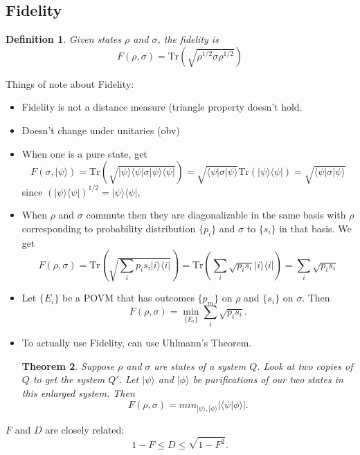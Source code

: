 \documentclass[12pt]{article}
\newtheorem{theorem}{Theorem}[section]
\newtheorem{define}[theorem]{Definition}
\begin{document}
\subsection{Fidelity}
\begin{define}
Given states $\rho$ and $\sigma$, the fidelity is
$$F(\rho,\sigma)=\text{Tr}(\sqrt{\rho^{1/2}\sigma\rho^{1/2}})$$
\end{define}
Things of note about Fidelity:
\begin{itemize}
\item Fidelity is not a distance measure (triangle property doesn't hold.
\item Doesn't change under unitaries (obv)
\item When one is a pure state, get 
$$ F(\sigma, |\psi\rangle)=\text{Tr}(\sqrt{|\psi\rangle\langle\psi|\sigma|\psi\rangle\langle\psi|})=\sqrt{\langle\psi|\sigma|\psi\rangle}\text{Tr}(|\psi\rangle\langle\psi|)=\sqrt{\langle\psi|\sigma|\psi\rangle}$$
since $(|\psi\rangle\langle\psi|)^{1/2}=|\psi\rangle\langle\psi|$, 
\item When $\rho$ and $\sigma$ commute then they are diagonalizable in the same basis with $\rho$ corresponding to probability 
distribution $\{p_i\}$ and $\sigma$ to $\{s_i\}$ in that basis. We get
$$F(\rho,\sigma)=\text{Tr}(\sqrt{\sum_ip_is_i|i\rangle\langle i|})=\text{Tr}(\sum_i\sqrt{p_is_i}|i\rangle\langle i|)=\sum_i\sqrt{p_is_i}$$
\item Let $\{E_i\}$ be a POVM that has outcomes $\{p_m\}$ on $\rho$ and $\{s_i\}$ on $\sigma$. Then
$$ F(\rho,\sigma)=\min_{\{E_i\}}\sum_i\sqrt{p_is_i}.$$
\item To actually use Fidelity, can use Uhlmann's Theorem.
\begin{theorem}
Suppose $\rho$ and $\sigma$ are states of a system $Q$. Look at two copies of $Q$ to get the system $Q'$. Let $|\psi\rangle$ and $|\phi\rangle$
be purifications of our two states in this enlarged system. Then
$$F(\rho,\sigma)=min_{|\psi\rangle, |\phi\rangle}|\langle\psi|\phi\rangle|.$$
\end{theorem}

\end{itemize}

$F$ and $D$ are closely related:
$$ 1-F\leq D\leq \sqrt{1-F^2}.$$
\end{document}
